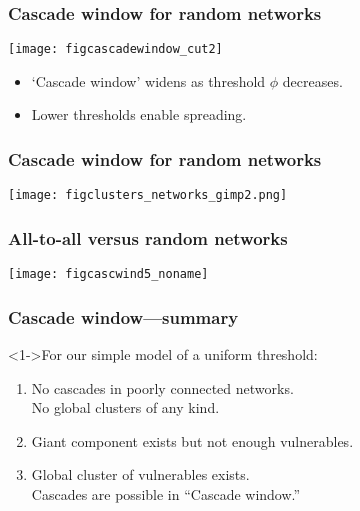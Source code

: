 \begin{frame}
  \frametitle{Cascade window for random networks}

  \begin{center}
  \texttt{[image: figcascadewindow\_cut2]}
  \end{center}

  \begin{itemize}
  \item<1-> \alert{`Cascade window'} widens as threshold $\phi$ decreases.
  \item<1-> Lower thresholds enable spreading.
  \end{itemize}

\end{frame}

\begin{frame}
  \frametitle{Cascade window for random networks}

  \begin{center}
  \texttt{[image: figclusters\_networks\_gimp2.png]}
  \end{center}

\end{frame}

\begin{frame}
  \frametitle{All-to-all versus random networks}
  \centering

  \begin{block}{}
    \texttt{[image: figcascwind5\_noname]}\\
  \end{block}

\end{frame}


\begin{frame}
  \frametitle{Cascade window---summary}
  
  \begin{block}<1->{For our simple model of a uniform threshold:}
    \begin{enumerate}
    \item<2-> 
       No cascades in poorly connected networks.\\
      No global clusters of any kind.
    \item<3-> 
       Giant component exists but not enough vulnerables.
    \item<4-> 
       Global cluster of vulnerables exists.\\
      Cascades are possible in \alert{``Cascade window.''}
    \end{enumerate}
  \end{block}

\end{frame}

